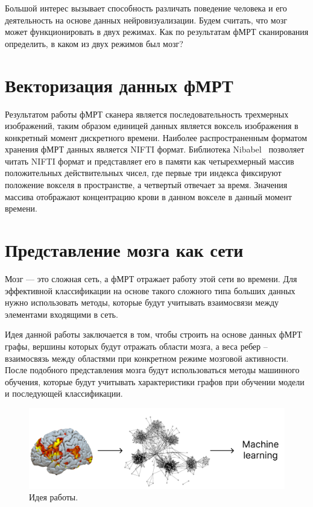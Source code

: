 \documentclass[specialist,
substylefile = spbu_report.rtx,
subf,href,colorlinks=true, 12pt]{disser}
\begin{document}
			Большой интерес вызывает способность различать поведение человека и его деятельность на основе данных нейровизуализации. Будем считать, что мозг может функционировать в двух режимах. Как по результатам фМРТ сканирования определить, в каком из двух режимов был мозг? 
			
		\section{Векторизация данных фМРТ}
			Результатом работы фМРТ сканера является последовательность трехмерных изображений, таким образом единицей данных является воксель изображения в конкретный момент дискретного времени. Наиболее распространенным форматом хранения фМРТ данных является NIFTI формат. Библиотека Nibabel~\cite{BrettMatthew2023} позволяет читать NIFTI формат и представляет его в памяти как четырехмерный массив положительных действительных чисел, где первые три индекса фиксируют положение вокселя в пространстве, а четвертый отвечает за время. Значения массива отображают концентрацию крови в данном вокселе в данный момент времени.
			
		\section{Представление мозга как сети}
			Мозг --- это сложная сеть, а фМРТ отражает работу этой сети во времени. Для эффективной классификации на основе такого сложного типа больших данных нужно использовать методы, которые будут учитывать взаимосвязи между элементами входящими в сеть.
			
			Идея данной работы заключается в том, чтобы строить на основе данных фМРТ графы, вершины которых будут отражать области мозга, а веса ребер – взаимосвязь между областями при конкретном режиме мозговой активности. После подобного представления мозга будут использоваться методы машинного обучения, которые будут учитывать характеристики графов при обучении модели и последующей классификации.
			
			\begin{figure}[h]
				\centering
				\includegraphics[width=12cm]{../images/fmri_graph_ml_1.pdf}
				\caption{Идея работы.} 
				\label{fg:1}
			\end{figure}
			
\end{document}
